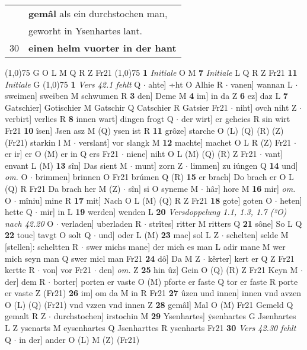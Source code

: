 \documentclass[8pt,a4paper,notitlepage]{article}
\begin{document}
\begin{table}[ht]
\begin{minipage}[t]{0.5\linewidth}
\begin{tabular}{rl}
 & \textbf{gemâl} als ein durchstochen man,\\ 
 & geworht in Ysenhartes lant.\\ 
30 & \textbf{einen helm vuorter in der hant}\\ 
\end{tabular}
\scriptsize
\line(1,0){75} \newline
G O L M Q R Z Fr21 \newline
\line(1,0){75} \newline
\textbf{1} \textit{Initiale} O M  \textbf{7} \textit{Initiale} L Q R Z Fr21  \textbf{11} \textit{Initiale} G  \newline
\line(1,0){75} \newline
\textbf{1} \textit{Vers 42.1 fehlt} Q   $\cdot$ ahte] ÷ht O Alhie R  $\cdot$ vanen] wannan L  $\cdot$ sweimen] sweiben M schwumen R \textbf{3} den] Deme M \textbf{4} im] in da Z \textbf{6} ez] daz L \textbf{7} Gatschier] Gotischier M Gatschir Q Catschier R Gatsier Fr21  $\cdot$ niht] ovch niht Z  $\cdot$ verbirt] verlies R \textbf{8} innen wart] dingen frogt Q  $\cdot$ der wirt] er geheies R sin wirt Fr21 \textbf{10} îsen] Jsen asz M (Q) ysen ist R \textbf{11} grôze] starche O (L) (Q) (R) (Z) (Fr21) starkin l\sout{ } M  $\cdot$ verslant] vor slangk M \textbf{12} machte] machet O L R (Z) Fr21  $\cdot$ er ir] er O (M) er in Q ers Fr21  $\cdot$ niene] niht O L (M) (Q) (R) Z Fr21  $\cdot$ vant] envant L (M) \textbf{13} sîn] Das sient M  $\cdot$ munt] zorn Z  $\cdot$ limmen] zu iúngen Q \textbf{14} und] \textit{om.} O  $\cdot$ brimmen] brinnen O Fr21 brúmen Q (R) \textbf{15} er brach] Do brach er O L (Q) R Fr21 Da brach her M (Z)  $\cdot$ sîn] si O syneme M  $\cdot$ hâr] hore M \textbf{16} mir] \textit{om.} O  $\cdot$ mîniu] mine R \textbf{17} mit] Nach O L (M) (Q) R Z Fr21 \textbf{18} gote] goten O  $\cdot$ heten] hette Q  $\cdot$ mir] in L \textbf{19} werden] wenden L \textbf{20} \textit{Versdoppelung 1.1, 1.3, 1.7 (²O) nach 42.20} O   $\cdot$ verladen] uberladen R  $\cdot$ strîtes] ritter M ritters Q \textbf{21} sône] So L Q \textbf{22} touc] tavgt O solt Q  $\cdot$ und] oder L (M) \textbf{23} mac] sol L Z  $\cdot$ schelten] selde M [stellen]: scheltten R  $\cdot$ swer michs mane] der mich es man L adir mane M wer mich seyn man Q swer micl man Fr21 \textbf{24} dô] Da M Z  $\cdot$ kêrter] kert er Q Z Fr21 kertte R  $\cdot$ von] vor Fr21  $\cdot$ den] \textit{om.} Z \textbf{25} hin ûz] Gein O (Q) (R) Z Fr21 Keyn M  $\cdot$ der] dem R  $\cdot$ borter] porten er vaste O (M) pforte er faste Q tor er faste R porte er vaste Z (Fr21) \textbf{26} im] om da M in R Fr21 \textbf{27} ûzen und innen] innen vnd avzen O (L) (Q) (Fr21) vnd vzzen vnd innen Z \textbf{28} gemâl] Mal O (M) Fr21 Gemeld Q gemalt R Z  $\cdot$ durchstochen] irstochin M \textbf{29} Ysenhartes] ẏsenhartes G Jsenhartes L Z ysenarts M eysenhartes Q Jsenharttes R ysenharts Fr21 \textbf{30} \textit{Vers 42.30 fehlt} Q   $\cdot$ in der] ander O (L) M (Z) (Fr21) \newline

\end{minipage}
\end{table}
\end{document}
